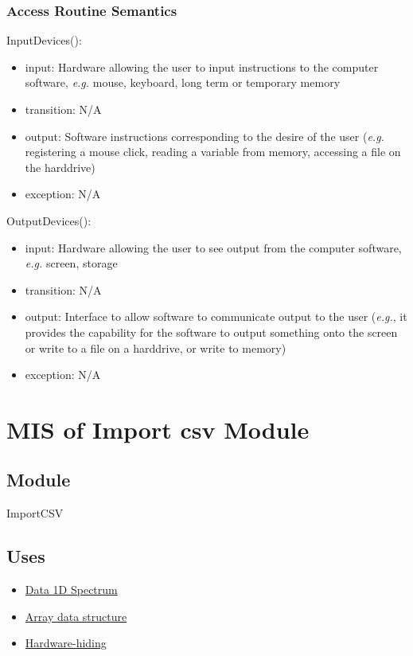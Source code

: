 \documentclass[12pt, titlepage]{article}
\begin{document}
\subsubsection{Access Routine Semantics}

\noindent InputDevices():
\begin{itemize}
    \item input: Hardware allowing the user to input instructions to the computer software, \textit{e.g.} mouse, keyboard, long term or temporary memory
    \item transition: N/A
    \item output: Software instructions corresponding to the desire of the user (\textit{e.g.} registering a mouse click, reading a variable from memory, accessing a file on the harddrive)
    \item exception: N/A
\end{itemize}

\noindent OutputDevices():
\begin{itemize}
    \item input: Hardware allowing the user to see output from the computer software, \textit{e.g.} screen, storage
    \item transition: N/A
    \item output: Interface to allow software to communicate output to the user (\textit{e.g.}, it provides the capability for the software to output something onto the screen or write to a file on a harddrive, or write to memory)
    \item exception: N/A
\end{itemize}

\section{MIS of Import csv Module} \label{Mod:ImportCSV} 
\subsection{Module}
ImportCSV

\subsection{Uses}
\begin{itemize}
\item \hyperref[Mod:Spectrum]{Data 1D Spectrum}
\item \hyperref[Mod:Array]{Array data structure}
\item \hyperref[Mod:HH]{Hardware-hiding}
\end{itemize}
\end{document}
